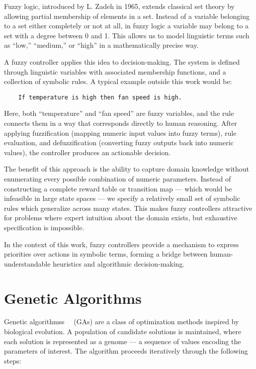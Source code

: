 \documentclass[12pt, a4paper]{report}
\begin{document}
	Fuzzy logic, introduced by L. Zadeh in 1965, extends classical set theory by allowing partial membership of elements in a set.
	Instead of a variable belonging to a set either completely or not at all, in fuzzy logic a variable may belong to a set with a degree between 0 and 1.
	This allows us to model linguistic terms such as “low,” “medium,” or “high” in a mathematically precise way.
	
	A fuzzy controller applies this idea to decision-making.
	The system is defined through linguistic variables with associated membership functions, and a collection of symbolic rules.
	A typical example outside this work would be:
	
\begin{verbatim}
	If temperature is high then fan speed is high.
\end{verbatim}
	
	Here, both “temperature” and “fan speed” are fuzzy variables, and the rule connects them in a way that corresponds directly to human reasoning.
	After applying fuzzification (mapping numeric input values into fuzzy terms), rule evaluation, and defuzzification (converting fuzzy outputs back into numeric values), the controller produces an actionable decision.
	
	The benefit of this approach is the ability to capture domain knowledge without enumerating every possible combination of numeric parameters.
	Instead of constructing a complete reward table or transition map — which would be infeasible in large state spaces — we specify a relatively small set of symbolic rules which generalize across many states.
	This makes fuzzy controllers attractive for problems where expert intuition about the domain exists, but exhaustive specification is impossible.
	
	In the context of this work, fuzzy controllers provide a mechanism to express priorities over actions in symbolic terms, forming a bridge between human-understandable heuristics and algorithmic decision-making.
	
	\section{Genetic Algorithms}
		
		Genetic algorithmss~\cite{song2023rl_ea}~\cite{beyer2002evolution_strategies} (GAs) are a class of optimization methods inspired by biological evolution.
		A population of candidate solutions is maintained, where each solution is represented as a genome — a sequence of values encoding the parameters of interest.
		The algorithm proceeds iteratively through the following steps:
		
\end{document}
